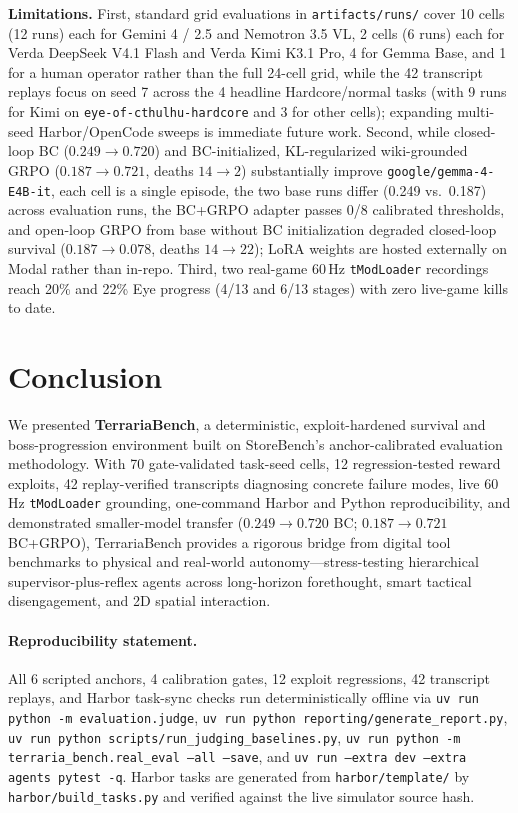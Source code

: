 \documentclass[10pt,letterpaper]{article}
\begin{document}
\textbf{Limitations.} First, standard grid evaluations in \texttt{artifacts/runs/} cover 10 cells (12 runs) each for Gemini 4 / 2.5 and Nemotron 3.5 VL, 2 cells (6 runs) each for Verda DeepSeek V4.1 Flash and Verda Kimi K3.1 Pro, 4 for Gemma Base, and 1 for a human operator rather than the full 24-cell grid, while the 42 transcript replays focus on seed 7 across the 4 headline Hardcore/normal tasks (with 9 runs for Kimi on \texttt{eye-of-cthulhu-hardcore} and 3 for other cells); expanding multi-seed Harbor/OpenCode sweeps is immediate future work. Second, while closed-loop BC ($0.249 \to 0.720$) and BC-initialized, KL-regularized wiki-grounded GRPO ($0.187 \to 0.721$, deaths $14 \to 2$) substantially improve \texttt{google/gemma-4-E4B-it}, each cell is a single episode, the two base runs differ (0.249 vs.\ 0.187) across evaluation runs, the BC+GRPO adapter passes 0/8 calibrated thresholds, and open-loop GRPO from base without BC initialization degraded closed-loop survival ($0.187 \to 0.078$, deaths $14 \to 22$); LoRA weights are hosted externally on Modal rather than in-repo. Third, two real-game 60\,Hz \texttt{tModLoader} recordings reach 20\% and 22\% Eye progress (4/13 and 6/13 stages) with zero live-game kills to date.

\section{Conclusion}

We presented \textbf{TerrariaBench}, a deterministic, exploit-hardened survival and boss-progression environment built on StoreBench's anchor-calibrated evaluation methodology. With 70 gate-validated task-seed cells, 12 regression-tested reward exploits, 42 replay-verified transcripts diagnosing concrete failure modes, live 60\,Hz \texttt{tModLoader} grounding, one-command Harbor and Python reproducibility, and demonstrated smaller-model transfer ($0.249 \to 0.720$ BC; $0.187 \to 0.721$ BC+GRPO), TerrariaBench provides a rigorous bridge from digital tool benchmarks to physical and real-world autonomy---stress-testing hierarchical supervisor-plus-reflex agents across long-horizon forethought, smart tactical disengagement, and 2D spatial interaction.

\paragraph{Reproducibility statement.} All 6 scripted anchors, 4 calibration gates, 12 exploit regressions, 42 transcript replays, and Harbor task-sync checks run deterministically offline via \texttt{uv run python -m evaluation.judge}, \texttt{uv run python reporting/generate\_report.py}, \texttt{uv run python scripts/run\_judging\_baselines.py}, \texttt{uv run python -m terraria\_bench.real\_eval --all --save}, and \texttt{uv run --extra dev --extra agents pytest -q}. Harbor tasks are generated from \texttt{harbor/template/} by \texttt{harbor/build\_tasks.py} and verified against the live simulator source hash.
\end{document}
